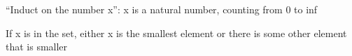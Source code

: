 \item “Induct on the number x”: x is a natural number, counting from 0 
to inf

If x is in the set, either x is the smallest element or there is some 
other element that is smaller
